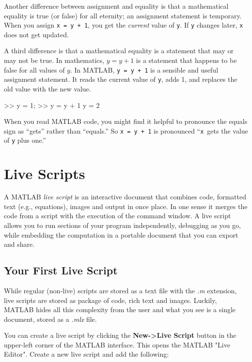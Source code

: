 
Another difference between assignment and equality is that a mathematical equality is true (or false) for all eternity;
an assignment statement is temporary.
When you assign \lstinline{x = y + 1}, you get the
\emph{current} value of \lstinline{y}.  If \lstinline{y} changes later, \lstinline{x}
does not get updated.

A third difference is that a mathematical equality is a statement that
may or may not be true.  In mathematics, $y = y+1$ is a statement that
happens to be false for all values of $y$.
In MATLAB, \lstinline{y = y + 1} is a sensible and useful assignment statement.
It reads the current value of \lstinline{y}, adds 1, and replaces the old value with the new value.

\begin{code}
>> y = 1;
>> y = y + 1
y = 2
\end{code}

When you read MATLAB code, you might find it helpful to pronounce
the equals sign as ``gets'' rather than ``equals.''  So \lstinline{x = y + 1}
is pronounced ``\lstinline{x}~gets the value of \lstinline{y} plus one.''

\section{Live Scripts}

A MATLAB \emph{live script} is an interactive document that combines code, formatted text (e.g., equations), images and output in once place.  In one sense it merges the code from a script with the execution of the command window.  A live script allows you to run sections of your program independently, debugging as you go, while embedding the computation in a portable document that you can export and share.

\subsection{Your First Live Script}

While regular (non-live) scripts are stored as a text file with the \emph{.m} extension, live scripts are stored as package of code, rich text and images.   Luckily, MATLAB hides all this complexity from the user and what you see is a single document, stored as a \emph{.mlx} file.

You can create a live script by clicking the \textbf{New->Live Script} button in the upper-left corner of the MATLAB interface.  This opens the MATLAB "Live Editor".  Create a new live script and add the following:

